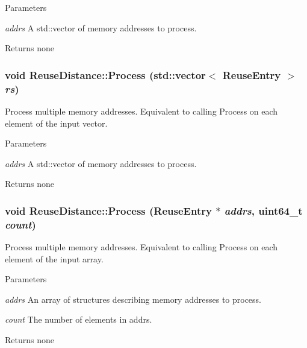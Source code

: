 \begin{DoxyParams}{Parameters}
\item[{\em addrs}]A std::vector of memory addresses to process.\end{DoxyParams}
\begin{DoxyReturn}{Returns}
none 
\end{DoxyReturn}
\hypertarget{class_reuse_distance_a372960c10d5fb6552c8dfcfd77da38ba}{
\subsubsection[{Process}]{\setlength{\rightskip}{0pt plus 5cm}void ReuseDistance::Process (std::vector$<$ {\bf ReuseEntry} $>$ {\em rs})}}
\label{class_reuse_distance_a372960c10d5fb6552c8dfcfd77da38ba}
Process multiple memory addresses. Equivalent to calling Process on each element of the input vector.


\begin{DoxyParams}{Parameters}
\item[{\em addrs}]A std::vector of memory addresses to process.\end{DoxyParams}
\begin{DoxyReturn}{Returns}
none 
\end{DoxyReturn}
\hypertarget{class_reuse_distance_aed9cbdd99de67972a37de4624614de9d}{
\subsubsection[{Process}]{\setlength{\rightskip}{0pt plus 5cm}void ReuseDistance::Process ({\bf ReuseEntry} $\ast$ {\em addrs}, \/  uint64\_\-t {\em count})}}
\label{class_reuse_distance_aed9cbdd99de67972a37de4624614de9d}
Process multiple memory addresses. Equivalent to calling Process on each element of the input array.


\begin{DoxyParams}{Parameters}
\item[{\em addrs}]An array of structures describing memory addresses to process. \item[{\em count}]The number of elements in addrs.\end{DoxyParams}
\begin{DoxyReturn}{Returns}
none 
\end{DoxyReturn}


